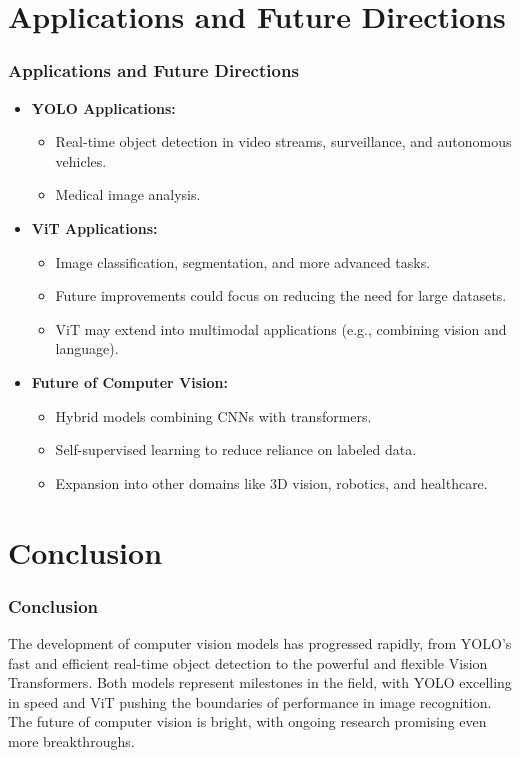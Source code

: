 \documentclass{beamer}
\begin{document}
\section{Applications and Future Directions}
\begin{frame}
\frametitle{Applications and Future Directions}
\begin{itemize}
    \item \textbf{YOLO Applications:}
        \begin{itemize}
            \item Real-time object detection in video streams, surveillance, and autonomous vehicles.
            \item Medical image analysis.
        \end{itemize}
    \item \textbf{ViT Applications:}
        \begin{itemize}
            \item Image classification, segmentation, and more advanced tasks.
            \item Future improvements could focus on reducing the need for large datasets.
            \item ViT may extend into multimodal applications (e.g., combining vision and language).
        \end{itemize}
    \item \textbf{Future of Computer Vision:}
        \begin{itemize}
            \item Hybrid models combining CNNs with transformers.
            \item Self-supervised learning to reduce reliance on labeled data.
            \item Expansion into other domains like 3D vision, robotics, and healthcare.
        \end{itemize}
\end{itemize}
\end{frame}


\section{Conclusion}
\begin{frame}
\frametitle{Conclusion}
The development of computer vision models has progressed rapidly, from YOLO’s fast and efficient real-time object detection to the powerful and flexible Vision Transformers. Both models represent milestones in the field, with YOLO excelling in speed and ViT pushing the boundaries of performance in image recognition. The future of computer vision is bright, with ongoing research promising even more breakthroughs.
\end{frame}
\end{document}
